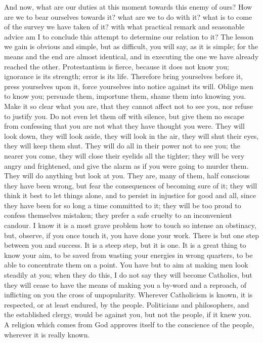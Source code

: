 And now, what are our duties at this moment towards
this enemy of ours? How are we to bear ourselves towards
it? what are we to do with it? what is to come of the
survey we have taken of it? with what practical remark
and seasonable advice am I to conclude this attempt to
determine our relation to it? The lesson we gain is
obvious and simple, but as difficult, you will say, as it
is simple; for the means and the end are almost
identical, and in executing the one we have already
reached the other. Protestantism is fierce, because it
does not know you; ignorance is its strength; error is
its life. Therefore bring yourselves before it, press
yourselves upon it, force yourselves into notice against
its will. Oblige men to know you; persuade them,
importune them, shame them into knowing you. Make it so
clear what you are, that they cannot affect not to see
you, nor refuse to justify you. Do not even let them off
with silence, but give them no escape from confessing
that you are not what they have thought you were. They
will look down, they will look aside, they will look in
the air, they will shut their eyes, they will keep them
shut. They will do all in their power not to see you; the
nearer you come, they will close their eyelids all the
tighter; they will be very angry and frightened, and give
the alarm as if you were going to murder them. They will
do anything but look at you. They are, many of them, half
conscious they have been wrong, but fear the consequences
of becoming sure of it; they will think it best to let
things alone, and to persist in injustice for good and
all, since they have been for so long a time committed to
it; they will be too proud to confess themselves
mistaken; they prefer a safe cruelty to an inconvenient
candour. I know it is a most grave problem how to touch
so intense an obstinacy, but, observe, if you once touch
it, you have done your work. There is but one step
between you and success. It is a steep step, but it is
one. It is a great thing to know your aim, to be saved
from wasting your energies in wrong quarters, to be able
to concentrate them on a point. You have but to aim at
making men look steadily at you; when they do this, I do
not say they will become Catholics, but they will cease
to have the means of making you a by-word and a reproach,
of inflicting on you the cross of unpopularity. Wherever
Catholicism is known, it is respected, or at least
endured, by the people. Politicians and philosophers, and
the established clergy, would be against you, but not the
people, if it knew you. A religion which comes from God
approves itself to the conscience of the people, wherever
it is really known.


